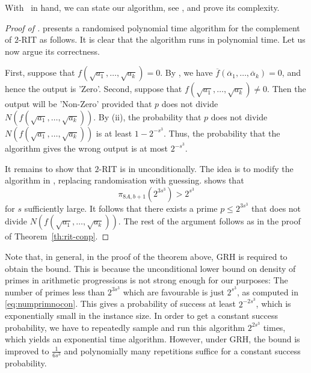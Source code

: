 With~ in hand, we can state our algorithm, see , and prove its complexity.


\begin{proof}[Proof of ]
 presents a 
randomised polynomial time algorithm for the complement of  $2$-RIT  as follows. It is clear that the algorithm runs in polynomial time. Let us now argue its correctness.
	
	First, suppose that $f(\sqrt{a_1},\ldots,\sqrt{a_k}) = 0$. By , we have $\overline{f}(\overline{\alpha}_1,\ldots,\overline{\alpha}_k) = 0$, and hence the output is 'Zero'. Second, suppose that $f(\sqrt{a_1},\ldots,\sqrt{a_k}) \neq 0$. Then the output will be 'Non-Zero' provided that $p$ does not divide $N(f(\sqrt{a_1},\ldots,\sqrt{a_k}))$. By (ii), the probability that $p$ does not divide $N(f(\sqrt{a_1},\ldots,\sqrt{a_k}))$ is at least $1 - 2^{-s^3}$. 
	Thus, the probability that the algorithm gives the wrong output is at most $2^{-s^3}$.

	 
	It remains to show that  $2$-RIT  is in {\coNP} unconditionally. The idea is to modify the algorithm in , replacing randomisation with guessing.  shows that \begin{equation}\label{eq:numprimnocon}\pi_{8A,b+1}(2^{3s^3}) > 2^{s^3}\end{equation}
	 for $s$ sufficiently large.
	 It follows that there exists a prime $p\leq 2^{3s^3}$
	 that does not divide $N(f(\sqrt{a_1},\ldots,\sqrt{a_k}))$. The rest of the argument follows as in the proof of Theorem~\ref{th:rit-conp}.
	\end{proof}
	

Note that, in general, in the proof of the theorem above, GRH is required to obtain the {\coRP} bound. 
This is because the unconditional lower bound on density of primes in arithmetic progressions is not strong enough for our purposes: 
The number of primes less than $2^{3s^3}$ which are favourable is just $2^{s^3}$, as computed in \eqref{eq:numprimnocon}. This gives a probability of success at least $2^{-2s^3}$, which is exponentially small in the instance size. In order to get a constant success probability, we have to repeatedly sample and run this algorithm $2^{2s^3}$ times, which yields an exponential time algorithm. However, under GRH, the bound is improved to $\frac{1}{6s^3}$ and polynomially many repetitions suffice for a constant success probability.

	
	
	